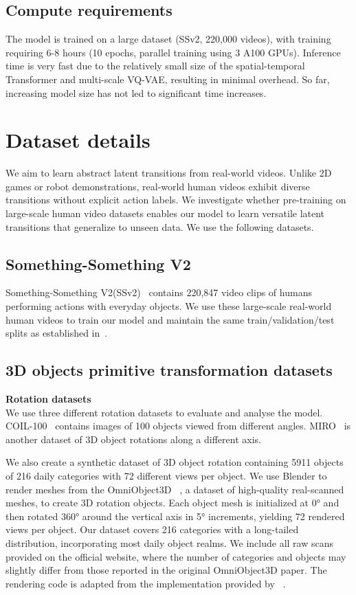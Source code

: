 \subsection{Compute requirements}
The model is trained on a large dataset (SSv2, 220,000 videos), with training requiring 6-8 hours (10 epochs, parallel training using 3 A100 GPUs). Inference time is very fast due to the relatively small size of the spatial-temporal Transformer and multi-scale VQ-VAE, resulting in minimal overhead. So far, increasing model size has not led to significant time increases. 

\newpage
\section{Dataset details}
\label{appendix:dataset}
We aim to learn abstract latent transitions from real-world videos. Unlike 2D games or robot demonstrations, real-world human videos exhibit diverse transitions without explicit action labels. We investigate whether pre-training on large-scale human video datasets enables our model to learn versatile latent transitions that generalize to unseen data.
We use the following datasets.
\subsection{Something-Something V2}
Something-Something V2(SSv2)~\citep{DBLP:journals/corr/GoyalKMMWKHFYMH17} contains 220,847 video clips of humans performing actions with everyday objects. We use these large-scale real-world human videos to train our model and maintain the same train/validation/test splits as established in~\cite{DBLP:journals/corr/GoyalKMMWKHFYMH17}.

\subsection{3D objects primitive transformation datasets}
\textbf{Rotation datasets} \\
We use three different rotation datasets to evaluate and analyse the model. COIL-100~\citep{nene1996columbia} contains images of 100 objects viewed from different angles. MIRO~\citep{kanezaki2018rotationnet} is another dataset of 3D object rotations along a different axis. 

We also create a synthetic dataset of 3D object rotation containing 5911 objects of 216 daily categories with 72 different views per object. We use Blender to render meshes from the OmniObject3D ~\citep{wu2023omniobject3d}, a dataset of high-quality real-scanned meshes, to create 3D rotation objects. Each object mesh is initialized at 0° and then rotated 360° around the vertical axis in 5° increments, yielding 72 rendered views per object. Our dataset covers 216 categories with a long-tailed distribution, incorporating most daily object realms. We include all raw scans provided on the official website, where the number of categories and objects may slightly differ from those reported in the original OmniObject3D paper. The rendering code is adapted from the implementation provided by ~\cite{deitke2023objaverse}.

